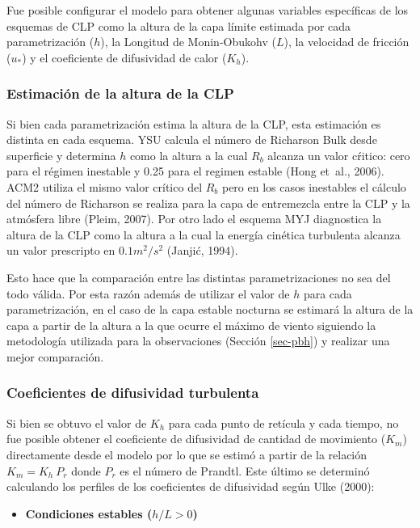 \documentclass[12pt,spanish,oneside, a4paper]{book}
\providecommand{\tightlist}{%
  \setlength{\itemsep}{0pt}\setlength{\parskip}{0pt}}
\begin{document}
Fue posible configurar el modelo para obtener algunas variables
específicas de los esquemas de CLP como la altura de la capa límite
estimada por cada parametrización (\(h\)), la Longitud de Monin-Obukohv
(\(L\)), la velocidad de fricción (\(u_*\)) y el coeficiente de
difusividad de calor (\(K_h\)).

\subsubsection{Estimación de la altura de la
CLP}\label{estimacion-de-la-altura-de-la-clp}

Si bien cada parametrización estima la altura de la CLP, esta estimación
es distinta en cada esquema. YSU calcula el número de Richarson Bulk
desde superficie y determina \(h\) como la altura a la cual \(R_b\)
alcanza un valor cŕitico: cero para el régimen inestable y 0.25 para el
regimen estable (Hong et~al., 2006). ACM2 utiliza el mismo valor crítico
del \(R_b\) pero en los casos inestables el cálculo del número de
Richarson se realiza para la capa de entremezcla entre la CLP y la
atmósfera libre (Pleim, 2007). Por otro lado el esquema MYJ diagnostica
la altura de la CLP como la altura a la cual la energía cinética
turbulenta alcanza un valor prescripto en \(0.1 m^2/s^2\) (Janjić,
1994).

Esto hace que la comparación entre las distintas parametrizaciones no
sea del todo válida. Por esta razón además de utilizar el valor de \(h\)
para cada parametrización, en el caso de la capa estable nocturna se
estimará la altura de la capa a partir de la altura a la que ocurre el
máximo de viento siguiendo la metodología utilizada para la
observaciones (Sección \ref{sec-pbh}) y realizar una mejor comparación.

\subsubsection{Coeficientes de difusividad
turbulenta}\label{coeficientes-de-difusividad-turbulenta}

Si bien se obtuvo el valor de \(K_h\) para cada punto de retícula y cada
tiempo, no fue posible obtener el coeficiente de difusividad de cantidad
de movimiento (\(K_m\)) directamente desde el modelo por lo que se
estimó a partir de la relación \(K_m = K_h \: P_r\) donde \(P_r\) es el
número de Prandtl. Este último se determinó calculando los perfiles de
los coeficientes de difusividad según Ulke (2000):

\begin{itemize}
\tightlist
\item
  \textbf{Condiciones estables (\(h/L > 0\))}
\end{itemize}
\end{document}
